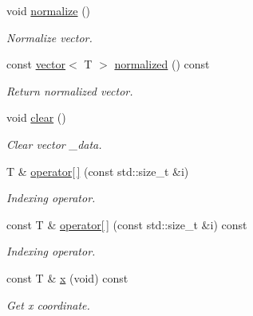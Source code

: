 \begin{DoxyCompactItemize}
void \hyperlink{classddd_1_1vector_aeff69a088496a7c9295b30b1c928df70}{normalize} ()
\begin{DoxyCompactList}\small\item\em Normalize vector. \end{DoxyCompactList}\item 
\mbox{\label{classddd_1_1vector_a40b593b08a2dd6af92c5c07bb9faa463}} 
const \hyperlink{classddd_1_1vector}{vector}$<$ T $>$ \hyperlink{classddd_1_1vector_a40b593b08a2dd6af92c5c07bb9faa463}{normalized} () const
\begin{DoxyCompactList}\small\item\em Return normalized vector. \end{DoxyCompactList}\item 
\mbox{\label{classddd_1_1point_ade1021a86b26ec7212cb83ebfd3b711f}} 
void \hyperlink{classddd_1_1point_ade1021a86b26ec7212cb83ebfd3b711f}{clear} ()
\begin{DoxyCompactList}\small\item\em Clear vector \+\_\+data. \end{DoxyCompactList}\item 
T \& \hyperlink{classddd_1_1point_aabf1454e1f0496fb70c1e62852aa2595}{operator\mbox{[}$\,$\mbox{]}} (const std\+::size\+\_\+t \&i)
\begin{DoxyCompactList}\small\item\em Indexing operator. \end{DoxyCompactList}\item 
const T \& \hyperlink{classddd_1_1point_a320e2bfca11915c5ebb9ed0581a3cab1}{operator\mbox{[}$\,$\mbox{]}} (const std\+::size\+\_\+t \&i) const
\begin{DoxyCompactList}\small\item\em Indexing operator. \end{DoxyCompactList}\item 
\mbox{\label{classddd_1_1point_af165c07ef348f3d795469b8b0918a3ba}} 
const T \& \hyperlink{classddd_1_1point_af165c07ef348f3d795469b8b0918a3ba}{x} (void) const
\begin{DoxyCompactList}\small\item\em Get x coordinate. \end{DoxyCompactList}\item 
\mbox{\label{classddd_1_1point_a632f731dfcc4cc1693948d861cb7327d}} 

\end{DoxyCompactItemize}
